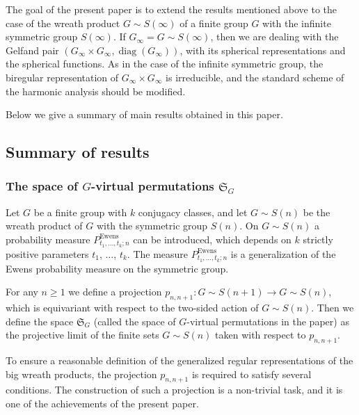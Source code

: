 \documentclass[12pt]{amsart}
\theoremstyle{definition}
\numberwithin{equation}{section}
\DeclareMathOperator{\diag}{diag}
\DeclareMathOperator{\Ewens}{Ewens}
\begin{document}
The goal of the present paper is to extend the results mentioned above to the case of the wreath product $G\sim S(\infty)$ of a finite group $G$ with the infinite symmetric group $S(\infty)$. If $G_{\infty}=G\sim S(\infty)$, then we are dealing with the Gelfand pair $\left(G_{\infty}\times G_{\infty},\diag\left(G_{\infty}\right)\right)$, with its spherical representations  and the spherical functions. As in the case of the infinite symmetric group, the biregular representation of $G_{\infty}\times G_{\infty}$ is irreducible, and the standard scheme of the harmonic analysis should be modified.

Below we give a summary of main results obtained in this paper.
\subsection{Summary of results}
\subsubsection{The space of $G$-virtual permutations $\mathfrak{S}_{G}$}
Let $G$ be a finite group with $k$ conjugacy classes, and let $G\sim S(n)$ be the wreath product of $G$ with the symmetric group $S(n)$. On $G\sim S(n)$ a probability measure
$P^{\Ewens}_{t_1,\ldots,t_k;n}$ can be introduced, which depends on $k$ strictly positive parameters $t_1$, $\ldots$, $t_k$. The measure $P^{\Ewens}_{t_1,\ldots,t_k;n}$ is a generalization of the Ewens probability measure on the symmetric group.

For any $n\geq 1$ we define a projection $p_{n,n+1}: G\sim S(n+1)\longrightarrow G\sim S(n)$, which is equivariant with respect to  the two-sided action of $G\sim S(n)$. Then we define the space $\mathfrak{S}_{G}$ (called the space of $G$-virtual permutations in the paper) as
the projective limit of the finite sets $G\sim S(n)$ taken with respect to $p_{n,n+1}$.

To ensure a reasonable definition of the generalized regular representations of the big wreath products, the projection $p_{n,n+1}$ is required to satisfy several  conditions.
The construction of such a projection is a non-trivial task, and it is one of the achievements of the present paper.
\end{document}
